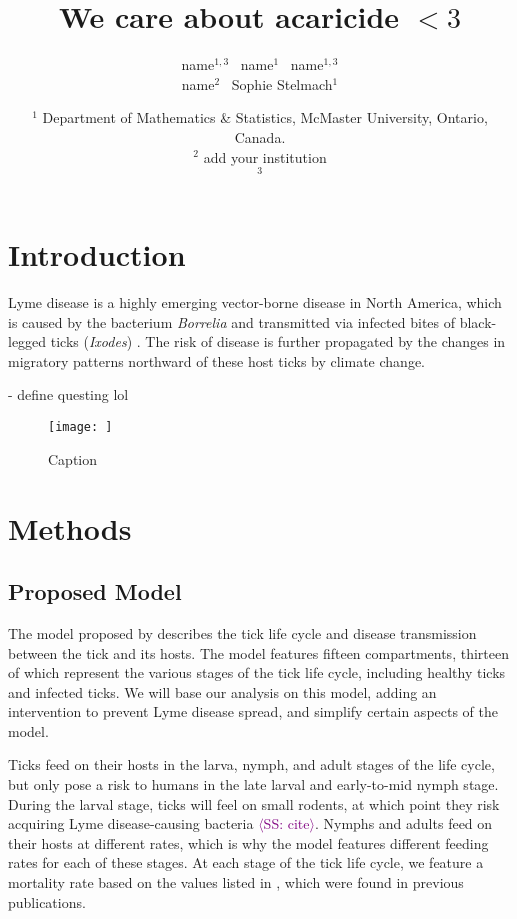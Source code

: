 \documentclass[12pt, centerh1]{article}
\title{We care about acaricide $<3$}
\author{\qquad name$^{1,3}$ \qquad\  name$^{1}$ \qquad\  name$^{1,3}$ \\  name$^{2}$ \quad\ Sophie Stelmach$^{1}$}
\date{{\small $^1$ Department of Mathematics \& Statistics, McMaster University, Ontario, Canada.\\[-6pt]
$^2$ add your institution\\[-6pt]
$^3$ \\[-6pt]
}
}
\newcommand{\sophie}[1]{{\textcolor{purple}{$\langle$SS: #1$\rangle$}}}
\begin{document}
\maketitle



\section{Introduction}
Lyme disease is a highly emerging vector-borne disease in North America, which is caused by the bacterium \textit{Borrelia} and transmitted via infected bites of black-legged ticks (\textit{Ixodes}) \citep{govcan}. The risk of disease is further propagated by the changes in migratory patterns northward of these host ticks by climate change. 

- define questing lol

\begin{figure}
    \centering
    \texttt{[image: ]}
    \caption{Caption}
    \label{fig:enter-label}
\end{figure}

\section{Methods}

\subsection{Proposed Model}
The model proposed by \citet{lou2014impact} describes the tick life cycle and disease transmission between the tick and its hosts. The model features fifteen compartments, thirteen of which represent the various stages of the tick life cycle, including healthy ticks and infected ticks. We will base our analysis on this model, adding an intervention to prevent Lyme disease spread, and simplify certain aspects of the model. 

Ticks feed on their hosts in the larva, nymph, and adult stages of the life cycle, but only pose a risk to humans in the late larval and early-to-mid nymph stage. During the larval stage, ticks will feel on small rodents, at which point they risk acquiring Lyme disease-causing bacteria \sophie{cite}. Nymphs and adults feed on their hosts at different rates, which is why the model features different feeding rates for each of these stages.
At each stage of the tick life cycle, we feature a mortality rate based on the values listed in \citet{lou2014impact}, which were found in previous publications. 
\end{document}
